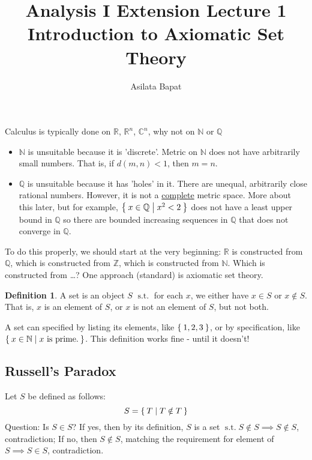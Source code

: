 \documentclass[12pt]{amsart}
\title{Analysis I Extension Lecture 1\\Introduction to Axiomatic Set Theory}
\author{Asilata Bapat}
\newcommand{\bbR}{\mathbb{R}}
\newcommand{\bbN}{\mathbb{N}}
\newcommand{\bbZ}{\mathbb{Z}}
\newcommand{\bbQ}{\mathbb{Q}}
\newcommand{\bbC}{\mathbb{C}}
\newcommand{\suchthat}{\operatorname{s.t.}}
\theoremstyle{plain}
\theoremstyle{remark}
\theoremstyle{definition}
\newtheorem*{define}{Definition}
\begin{document}
\maketitle
{}

Calculus is typically done on $\bbR$, $\bbR^n$, $\bbC^n$, why not on $\bbN$ or $\bbQ$
\begin{itemize}[-]
	\item $\bbN$ is unsuitable because it is 'discrete'. Metric on $\bbN$ does not have arbitrarily small numbers. That is, if $d(m,n) < 1$, then $m = n$.
	\item $\bbQ$ is unsuitable because it has 'holes' in it. There are unequal, arbitrarily close rational numbers. However, it is not a 	     \ul{complete} metric space.
	\newline
	More about this later, but for example, $\Set{x \in \bbQ | x^2 < 2}$ does not have a least upper bound in $\bbQ$ so there are bounded increasing sequences in $\bbQ$ that does not converge in $\bbQ$.
\end{itemize}

To do this properly, we should start at the very beginning: $\bbR$ is constructed from $\bbQ$, which is constructed from $\bbZ$, which is constructed from $\bbN$. Which is constructed from \dots ?
\newline
One approach (standard) is axiomatic set theory.
\begin{define}
	A set is an object $S$ $\suchthat$ for each $x$, we either have $x \in S$ or $x \notin S$. That is, $x$ is an element of $S$, or $x$ is not an element of $S$, but not both.
\end{define}
A set can specified by listing its elements, like $\Set{1, 2, 3}$, or by specification, like $\Set{x \in \bbN| x \text{ is prime.}}$. This definition works fine - until it doesn't!
\newline
\subsection*{Russell's Paradox}
Let $S$ be defined as follows:
\begin{equation*}
	S = \Set{T| T \notin T}
\end{equation*}
Question: Is $S \in S$?
\newline
If yes, then by its definition, $S$ is a set $\suchthat S \notin S \implies S \notin S$, contradiction;
If no, then $S \notin S$, matching the requirement for element of $S \implies S \in S$, contradiction.
\end{document}
